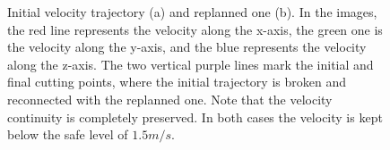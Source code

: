 \begin{figure}[!t]
\begin{center}
\begin{minipage}{.45\linewidth}
		\end{minipage}
	\end{center}
	\caption{Initial velocity trajectory (a) and replanned one (b).
    In the images, the red line represents the velocity along the x-axis, the green one is the velocity along the y-axis,
    and the blue represents the velocity along the z-axis. The two vertical purple lines mark the initial and final cutting
    points, where the initial trajectory is broken and reconnected with the replanned one. Note that the velocity continuity
    is completely preserved. In both cases the velocity is kept below the safe level of $1.5m/s$.}%
    \label{FIG:REPLANNING-RESULTS-VELOCITY}
\end{figure}
\begin{figure}[!t]
	\begin{center}
		\begin{minipage}{.45\linewidth}
			\centering
		\end{minipage}
		\begin{minipage}{.45\linewidth}
			\centering
			\subfloat[]{%
				\label{FIG:REPLANNING-RESULTS-ACCELERATION-B}%
}
\end{minipage}
\end{center}
\end{figure}
